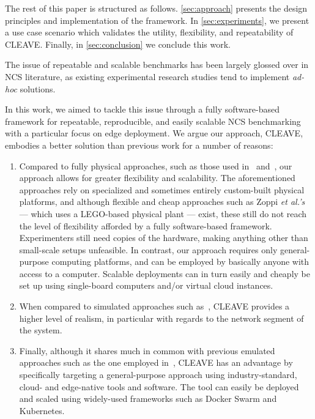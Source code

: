 The rest of this paper is structured as follows.
\cref{sec:approach} presents the design principles and implementation of the framework.
In \cref{sec:experiments}, we present a use case scenario which validates the utility, flexibility, and repeatability of \ac{CLEAVE}.
Finally, in \cref{sec:conclusion} we conclude this work.

The issue of repeatable and scalable benchmarks has been largely glossed over in \ac{NCS} literature, as existing experimental research studies tend to implement \emph{ad-hoc} solutions.

In this work, we aimed to tackle this issue through a fully software-based framework for repeatable, reproducible, and easily scalable \ac{NCS} benchmarking with a particular focus on edge deployment.
We argue our approach, \ac{CLEAVE}, embodies a better solution than previous work for a number of reasons:
\begin{enumerate}
    \item Compared to fully physical approaches, such as those used in\ \cite{Baumann2018LowPower} and\ \cite{Cuenca2019UAV}, our approach allows for greater flexibility and scalability.
    The aforementioned approaches rely on specialized and sometimes entirely custom-built physical platforms, and although flexible and cheap approaches such as Zoppi \emph{et al.'s} --- which uses a LEGO-based physical plant --- exist, these still do not reach the level of flexibility afforded by a fully software-based framework. 
    Experimenters still need copies of the hardware, making anything other than small-scale setups unfeasible.
    In contrast, our approach requires only general-purpose computing platforms, and can be employed by basically anyone with access to a computer.
    Scalable deployments can in turn easily and cheaply be set up using single-board computers and/or virtual cloud instances.
    \item When compared to simulated approaches such as\ \cite{Ma2019DynamicSched}, \ac{CLEAVE} provides a higher level of realism, in particular with regards to the network segment of the system.
    \item Finally, although it shares much in common with previous emulated approaches such as the one employed in\ \cite{Wang2020VoltageControl}, \ac{CLEAVE} has an advantage by specifically targeting a general-purpose approach using industry-standard, cloud- and edge-native tools and software.
    The tool can easily be deployed and scaled using widely-used frameworks such as Docker Swarm and Kubernetes.
\end{enumerate}

